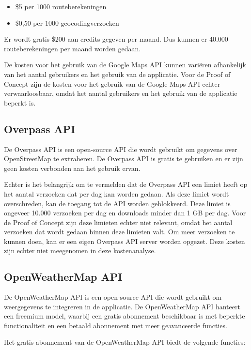 \begin{itemize}
    \item \$5 per 1000 routeberekeningen
    \item \$0,50 per 1000 geocodingverzoeken
\end{itemize}

Er wordt gratis \$200 aan credits gegeven per maand. 
Dus kunnen er 40.000 routeberekeningen per maand worden gedaan.

De kosten voor het gebruik van de Google Maps API kunnen variëren afhankelijk van het aantal gebruikers en het gebruik van de applicatie. Voor de Proof of Concept zijn de kosten voor het gebruik van de Google Maps API echter verwaarloosbaar, omdat het aantal gebruikers en het gebruik van de applicatie beperkt is.

\subsection{Overpass API}%

De Overpass API is een open-source API die wordt gebruikt om gegevens over OpenStreetMap te extraheren. De Overpass API is gratis te gebruiken en er zijn geen kosten verbonden aan het gebruik ervan.

Echter is het belangrijk om te vermelden dat de Overpass API een limiet heeft op het aantal verzoeken dat per dag kan worden gedaan. Als deze limiet wordt overschreden, kan de toegang tot de API worden geblokkeerd. Deze limiet is ongeveer 10.000 verzoeken per dag en downloads minder dan 1 GB per dag. Voor de Proof of Concept zijn deze limieten echter niet relevant, omdat het aantal verzoeken dat wordt gedaan binnen deze limieten valt. Om meer verzoeken te kunnen doen, kan er een eigen Overpass API server worden opgezet. Deze kosten zijn echter niet meegenomen in deze kostenanalyse.

\subsection{OpenWeatherMap API}%

De OpenWeatherMap API is een open-source API die wordt gebruikt om weergegevens te integreren in de applicatie. De OpenWeatherMap API hanteert een freemium model, waarbij een gratis abonnement beschikbaar is met beperkte functionaliteit en een betaald abonnement met meer geavanceerde functies. 

Het gratis abonnement van de OpenWeatherMap API biedt de volgende functies:


